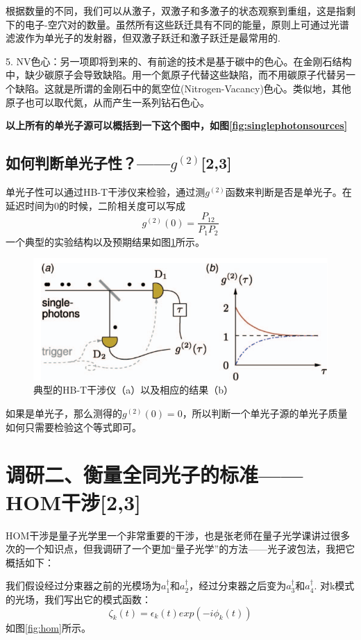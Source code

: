 根据数量的不同，我们可以从激子，双激子和多激子的状态观察到重组，这是指剩下的电子-空穴对的数量。虽然所有这些跃迁具有不同的能量，原则上可通过光谱滤波作为单光子的发射器，但双激子跃迁和激子跃迁是最常用的.

5.  NV色心：另一项即将到来的、有前途的技术是基于碳中的色心。在金刚石结构中，缺少碳原子会导致缺陷。用一个氮原子代替这些缺陷，而不用碳原子代替另一个缺陷。这就是所谓的金刚石中的氮空位(Nitrogen-Vacancy)色心。类似地，其他原子也可以取代氮，从而产生一系列钻石色心。

\textbf{以上所有的单光子源可以概括到一下这个图中，如图\ref{fig:singlephotonsources}}

\subsection{如何判断单光子性？——$g^{(2)}$[2,3]}
单光子性可以通过HB-T干涉仪来检验，通过测$g^{(2)}$函数来判断是否是单光子。在延迟时间为0的时候，二阶相关度可以写成\[g^{(2)}(0)=\frac{P_{12}}{P_1P_2}\]
一个典型的实验结构以及预期结果如图\ref{fig:g2}所示。

\begin{figure}[ht]
	\centering
	\includegraphics[scale=0.25]{pic/g2}
	\caption{典型的HB-T干涉仪（a）以及相应的结果（b）}
	\label{fig:g2}
\end{figure}

如果是单光子，那么测得的$g^{(2)}(0)=0$，所以判断一个单光子源的单光子质量如何只需要检验这个等式即可。


\section{调研二、衡量全同光子的标准——HOM干涉[2,3]}

HOM干涉是量子光学里一个非常重要的干涉，也是张老师在量子光学课讲过很多次的一个知识点，但我调研了一个更加“量子光学”的方法——光子波包法，我把它概括如下：

我们假设经过分束器之前的光模场为$a_1^\dagger$和$a_2^\dagger$，经过分束器之后变为$a_3^\dagger$和$a_4^\dagger$. 对k模式的光场，我们写出它的模式函数：
\[\zeta_k(t)=\epsilon_k(t)exp(-i\phi_k(t))\]
如图\ref{fig:hom}所示。


